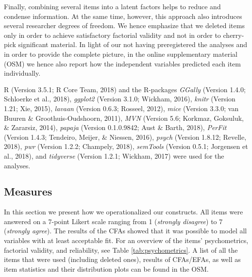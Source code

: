 \documentclass[man,floatsintext]{apa6}
\begin{document}
Finally, combining several items into a latent factors helps to reduce and condense information. At the same time, however, this approach also introduces several researcher degrees of freedom. We hence emphasize that we deleted items only in order to achieve satisfactory factorial validity and not in order to cherry-pick significant material. In light of our not having preregistered the analyses and in order to provide the complete picture, in the online supplementary material (OSM) we hence also report how the independent variables predicted each item individually.

R (Version 3.5.1; R Core Team, 2018) and the R-packages \emph{GGally} (Version 1.4.0; Schloerke et al., 2018), \emph{ggplot2} (Version 3.1.0; Wickham, 2016), \emph{knitr} (Version 1.21; Xie, 2015), \emph{lavaan} (Version 0.6.3; Rosseel, 2012), \emph{mice} (Version 3.3.0; van Buuren \& Groothuis-Oudshoorn, 2011), \emph{MVN} (Version 5.6; Korkmaz, Goksuluk, \& Zararsiz, 2014), \emph{papaja} (Version 0.1.0.9842; Aust \& Barth, 2018), \emph{PerFit} (Version 1.4.3; Tendeiro, Meijer, \& Niessen, 2016), \emph{psych} (Version 1.8.12; Revelle, 2018), \emph{pwr} (Version 1.2.2; Champely, 2018), \emph{semTools} (Version 0.5.1; Jorgensen et al., 2018), and \emph{tidyverse} (Version 1.2.1; Wickham, 2017) were used for the analyses.

\hypertarget{measures}{%
\subsection{Measures}\label{measures}}

In this section we present how we operationalized our constructs. All items were answered on a 7-point Likert scale ranging from 1 (\emph{strongly disagree}) to 7 (\emph{strongly agree}). The results of the CFAs showed that it was possible to model all variables with at least acceptable fit. For an overview of the items' psychometrics, factorial validity, and reliability, see Table \ref{tab:psychometrics}. A list of all the items that were used (including deleted ones), results of CFAs/EFAs, as well as item statistics and their distribution plots can be found in the OSM.
\end{document}
